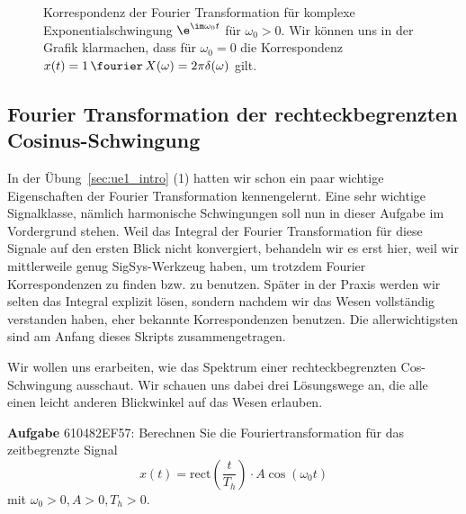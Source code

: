 \begin{figure}[h!]
\centering
%
%
%
%
\caption{Korrespondenz der Fourier Transformation für komplexe Exponentialschwingung
$\e^{\im\omega_0 t}$ für $\omega_0>0$.
Wir können uns in der Grafik klarmachen, dass für $\omega_0=0$ die Korrespondenz
$x(t)=1 \, \fourier \, X(\omega)=2\pi\delta(\omega)$ gilt.}
\label{fig:ue4_exp_ft}
\end{figure}





\clearpage
\subsection{Fourier Transformation der rechteckbegrenzten Cosinus-Schwingung}
\label{sec:610482EF57}
\begin{Ziel}
In der Übung~\ref{sec:ue1_intro} (1) hatten wir schon ein paar wichtige Eigenschaften der Fourier Transformation
kennengelernt. Eine sehr wichtige Signalklasse, nämlich harmonische
Schwingungen soll nun in dieser Aufgabe im Vordergrund stehen.
%
Weil das Integral der Fourier Transformation für diese Signale auf den ersten
Blick nicht konvergiert, behandeln wir es erst hier, weil wir mittlerweile genug
SigSys-Werkzeug haben, um trotzdem Fourier Korrespondenzen zu finden bzw. zu
benutzen.
%
Später in der Praxis werden wir selten das Integral explizit lösen, sondern
nachdem wir das Wesen vollständig verstanden haben, eher bekannte Korrespondenzen
benutzen. Die allerwichtigsten sind am Anfang dieses Skripts zusammengetragen.

Wir wollen uns erarbeiten, wie das Spektrum einer rechteckbegrenzten Cos-Schwingung
ausschaut. Wir schauen uns dabei drei Lösungswege an, die alle einen leicht anderen
Blickwinkel auf das Wesen erlauben.
\end{Ziel}
\textbf{Aufgabe} {\tiny 610482EF57}: Berechnen Sie die Fouriertransformation für
das zeitbegrenzte Signal
\begin{equation}
x(t) = \mathrm{rect}(\frac{t}{T_h}) \cdot A \cos(\omega_0 t)
\end{equation}
mit $\omega_0>0, A>0, T_h>0$.

